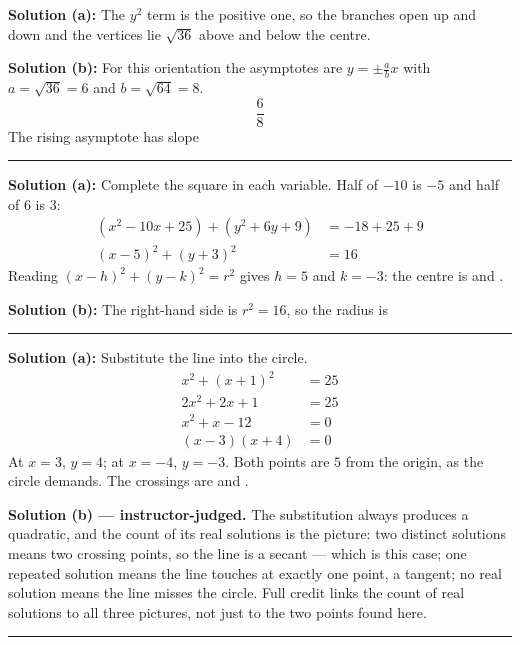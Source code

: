 \documentclass[12pt]{article}
\begin{document}

\textbf{Solution (a):} The $y^2$ term is the positive one, so the branches open up and down
and the vertices lie $\sqrt{36}$ above and below the centre. 

\textbf{Solution (b):} For this orientation the asymptotes are $y = \pm \frac{a}{b}x$ with
$a = \sqrt{36} = 6$ and $b = \sqrt{64} = 8$.
\[ \frac{6}{8} \]
The rising asymptote has slope 

\vspace{0.2cm}\noindent\rule{\linewidth}{0.2pt}


\textbf{Solution (a):} Complete the square in each variable. Half of $-10$ is $-5$ and half of
$6$ is $3$:
\begin{align*}
  (x^2 - 10x + 25) + (y^2 + 6y + 9) &= -18 + 25 + 9 \\
  (x - 5)^2 + (y + 3)^2 &= 16
\end{align*}
Reading $(x-h)^2 + (y-k)^2 = r^2$ gives $h = 5$ and $k = -3$: the centre is
 and .

\textbf{Solution (b):} The right-hand side is $r^2 = 16$, so the radius is 

\vspace{0.2cm}\noindent\rule{\linewidth}{0.2pt}


\textbf{Solution (a):} Substitute the line into the circle.
\begin{align*}
  x^2 + (x + 1)^2 &= 25 \\
  2x^2 + 2x + 1 &= 25 \\
  x^2 + x - 12 &= 0 \\
  (x - 3)(x + 4) &= 0
\end{align*}
At $x = 3$, $y = 4$; at $x = -4$, $y = -3$. Both points are $5$ from the origin, as the
circle demands. The crossings are  and .

\vspace{0.15cm}
\textbf{Solution (b) --- instructor-judged.} The substitution always produces a quadratic,
and the count of its real solutions is the picture: two distinct solutions means two crossing
points, so the line is a secant --- which is this case; one repeated solution means the line
touches at exactly one point, a tangent; no real solution means the line misses the circle.
Full credit links the count of real solutions to all three pictures, not just to the two
points found here.

\vspace{0.2cm}\noindent\rule{\linewidth}{0.2pt}
\end{document}
